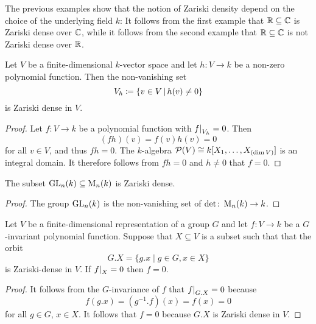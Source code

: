 \begin{warning}
  The previous examples show that the notion of Zariski density depend on the choice of the underlying field $k$:
  It follows from the first example that $\mathbb{R} \subseteq \mathbb{C}$ is Zariski dense over $\mathbb{C}$, while it follows from the second example that $\mathbb{R} \subseteq \mathbb{C}$ is not Zariski dense over $\mathbb{R}$.
\end{warning}


\begin{lemma}
  Let $V$ be a finite-dimensional $k$-vector space and let $h \colon V \to k$ be a non-zero polynomial function.
  Then the non-vanishing set
  \[
              V_h
    \defined  \{
                v \in V
              \suchthat
                h(v) \neq 0
              \}
  \]
  is Zariski dense in $V$.
\end{lemma}
\begin{proof}
  Let $f \colon V \to k$ be a polynomial function with $\restrict{f}{V_h} = 0$.
  Then
  \[
      (fh)(v)
    = f(v)h(v)
    = 0
  \]
  for all $v \in V$, and thus $fh = 0$.
  The $k$-algebra $\mathcal{P}(V) \cong k[X_1, \dotsc, X_{(\dim V)}]$ is an integral domain.
  It therefore follows from $fh = 0$ and $h \neq 0$ that $f = 0$.
\end{proof}


\begin{corollary}
  \label{corollary: GLn is Zariski dense in Mn}
  The subset $\operatorname{GL}_n(k) \subseteq \operatorname{M}_n(k)$ is Zariski dense.
\end{corollary}


\begin{proof}
  The group $\operatorname{GL}_n(k)$ is the non-vanishing set of $\det \colon \operatorname{M}_n(k) \to k$.
\end{proof}


\begin{lemma}
  \label{lemma: zariski density orbits}
  Let $V$ be a finite-dimensional representation of a group $G$ and let $f \colon V \to k$ be a $G$-invariant polynomial function.
  Suppose that $X \subseteq V$ is a subset such that that the orbit
  \[
      G.X
    = \{
        g.x
      \mid
        g \in G,
        x \in X
      \}
  \]
  is Zariski-dense in $V$.
  If $\restrict{f}{X} = 0$ then $f = 0$.
\end{lemma}


\begin{proof}
  It follows from the $G$-invariance of $f$ that $\restrict{f}{G.X} = 0$ because
  \[
      f(g.x)
    = \left( g^{-1}.f \right)(x)
    = f(x)
    = 0
  \]
  for all $g \in G$, $x \in X$.
  It follows that $f = 0$ because $G.X$ is Zariski dense in $V$.
\end{proof}


